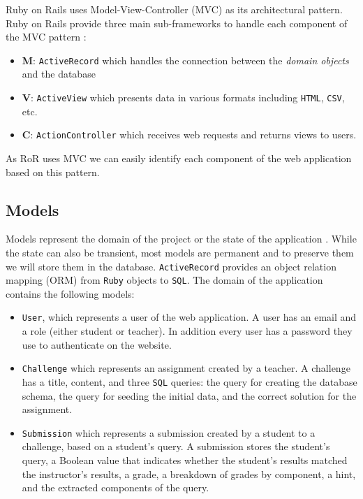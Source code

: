 Ruby on Rails uses Model-View-Controller (MVC) as its architectural pattern. Ruby on Rails provide three main sub-frameworks to handle each component of the MVC pattern \citep{ruby_on_rails}:
\begin{itemize}
    \item \textbf{M}: \texttt{ActiveRecord} which handles the connection between the \textit{domain objects} and the database
    \item \textbf{V}: \texttt{ActiveView} which presents data in various formats including \texttt{HTML}, \texttt{CSV}, etc.
    \item \textbf{C}: \texttt{ActionController} which receives web requests and returns views to users.
\end{itemize}
As RoR uses MVC we can easily identify each component of the web application based on this pattern.

\subsection{Models}

Models represent the domain of the project \citep{ruby_on_rails} or the state of the application \citep{ruby_on_rails_book}. While the state can also be transient, most models are permanent and to preserve them we will store them in the database. \texttt{ActiveRecord} provides an object relation mapping (ORM) from \texttt{Ruby} objects to \texttt{SQL}. The domain of the application contains the following models:
\begin{itemize}
    \item \texttt{User}, which represents a user of the web application. A user has an email and a role (either student or teacher). In addition every user has a password they use to authenticate on the website.
    \item \texttt{Challenge} which represents an assignment created by a teacher. A challenge has a title, content, and three \texttt{SQL} queries: the query for creating the database schema, the query for seeding the initial data, and the correct solution for the assignment.
    \item \texttt{Submission} which represents a submission created by a student to a challenge, based on a student's query. A submission stores the student's query, a Boolean value that indicates whether the student's results matched the instructor's results, a grade, a breakdown of grades by component, a hint, and the extracted components of the query.
\end{itemize}

